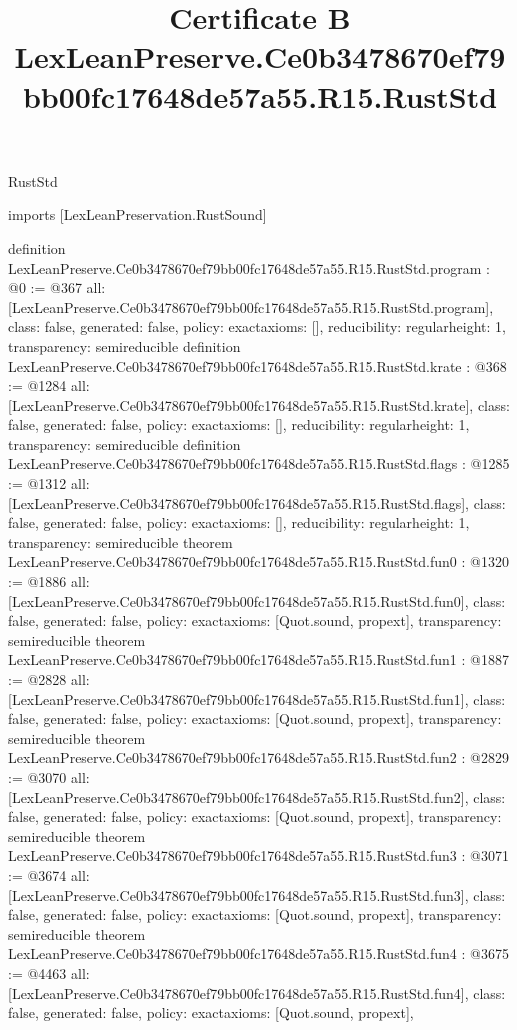 \begin{lexlean}{RustStd}
\title{Certificate B LexLeanPreserve.Ce0b3478670ef79bb00fc17648de57a55.R15.RustStd}
\begin{coremodule}
imports [LexLeanPreservation.RustSound]

definition LexLeanPreserve.Ce0b3478670ef79bb00fc17648de57a55.R15.RustStd.program : @0 := @367 {
  all: [LexLeanPreserve.Ce0b3478670ef79bb00fc17648de57a55.R15.RustStd.program],
  class: false,
  generated: false,
  policy: exact{axioms: []},
  reducibility: regular{height: 1},
  transparency: semireducible
}
definition LexLeanPreserve.Ce0b3478670ef79bb00fc17648de57a55.R15.RustStd.krate : @368 := @1284 {
  all: [LexLeanPreserve.Ce0b3478670ef79bb00fc17648de57a55.R15.RustStd.krate],
  class: false,
  generated: false,
  policy: exact{axioms: []},
  reducibility: regular{height: 1},
  transparency: semireducible
}
definition LexLeanPreserve.Ce0b3478670ef79bb00fc17648de57a55.R15.RustStd.flags : @1285 := @1312 {
  all: [LexLeanPreserve.Ce0b3478670ef79bb00fc17648de57a55.R15.RustStd.flags],
  class: false,
  generated: false,
  policy: exact{axioms: []},
  reducibility: regular{height: 1},
  transparency: semireducible
}
theorem LexLeanPreserve.Ce0b3478670ef79bb00fc17648de57a55.R15.RustStd.fun0 : @1320 := @1886 {
  all: [LexLeanPreserve.Ce0b3478670ef79bb00fc17648de57a55.R15.RustStd.fun0],
  class: false,
  generated: false,
  policy: exact{axioms: [Quot.sound, propext]},
  transparency: semireducible
}
theorem LexLeanPreserve.Ce0b3478670ef79bb00fc17648de57a55.R15.RustStd.fun1 : @1887 := @2828 {
  all: [LexLeanPreserve.Ce0b3478670ef79bb00fc17648de57a55.R15.RustStd.fun1],
  class: false,
  generated: false,
  policy: exact{axioms: [Quot.sound, propext]},
  transparency: semireducible
}
theorem LexLeanPreserve.Ce0b3478670ef79bb00fc17648de57a55.R15.RustStd.fun2 : @2829 := @3070 {
  all: [LexLeanPreserve.Ce0b3478670ef79bb00fc17648de57a55.R15.RustStd.fun2],
  class: false,
  generated: false,
  policy: exact{axioms: [Quot.sound, propext]},
  transparency: semireducible
}
theorem LexLeanPreserve.Ce0b3478670ef79bb00fc17648de57a55.R15.RustStd.fun3 : @3071 := @3674 {
  all: [LexLeanPreserve.Ce0b3478670ef79bb00fc17648de57a55.R15.RustStd.fun3],
  class: false,
  generated: false,
  policy: exact{axioms: [Quot.sound, propext]},
  transparency: semireducible
}
theorem LexLeanPreserve.Ce0b3478670ef79bb00fc17648de57a55.R15.RustStd.fun4 : @3675 := @4463 {
  all: [LexLeanPreserve.Ce0b3478670ef79bb00fc17648de57a55.R15.RustStd.fun4],
  class: false,
  generated: false,
  policy: exact{axioms: [Quot.sound, propext]},
}
\end{coremodule}
\end{lexlean}
